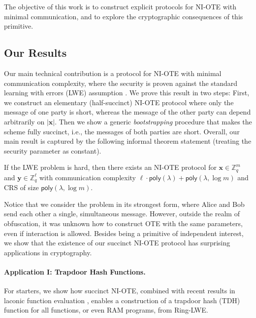 \documentclass{theoretics}
\newcommand{\Z}{\mathbb{Z}}
\newcommand{\poly}{\mathsf{poly}}
\renewcommand{\sec}{\ensuremath{\lambda}}
\begin{document}
The objective of this work is to construct explicit protocols for NI-OTE with minimal communication, and to explore the cryptographic consequences of this primitive.

\subsection{Our Results}

Our main technical contribution is a protocol for NI-OTE with minimal communication complexity, where the security is proven against the standard learning with errors (LWE) assumption \cite{STOC:Regev05}.
We prove this result in two steps: First, we construct an elementary (half-succinct) NI-OTE protocol where only the message of one party is short, whereas the message of the other party can depend arbitrarily on $|\mathbf{x}|$. Then we show a generic \emph{bootstrapping} procedure that makes the scheme fully succinct, i.e., the messages of both parties are short.
Overall, our main result is captured by the following informal theorem statement (treating the security parameter as constant).
\begin{theorem}[Informal]
    If the LWE problem is hard, then there exists an NI-OTE protocol for $\mathbf{x}\in\Z_q^m$ and $\mathbf{y}\in\Z_q^\ell$ with communication complexity $\ell\cdot \poly(\sec) + \poly(\sec, \log m)$ and CRS of size $\poly(\sec, \log m)$.
\end{theorem}
%
{Notice that we consider the problem in its strongest form, where Alice and Bob send each other a single, simultaneous message. However, outside the realm of obfuscation, it was unknown how to construct OTE with the same parameters, even if interaction is allowed.}
Besides being a primitive of independent interest, we show that the existence of our succinct NI-OTE protocol has surprising applications in cryptography. 

\paragraph{Application I: Trapdoor Hash Functions.}
For starters, we show how succinct NI-OTE, combined with recent results in laconic function evaluation \cite{FOCS:QuaWeeWic18,FOCS:HsiLinLuo23,C:DHMWW24}, enables a construction of a trapdoor hash (TDH) function \cite{C:DGIMMO19} for all functions, or even RAM programs, from Ring-LWE. 
\end{document}
